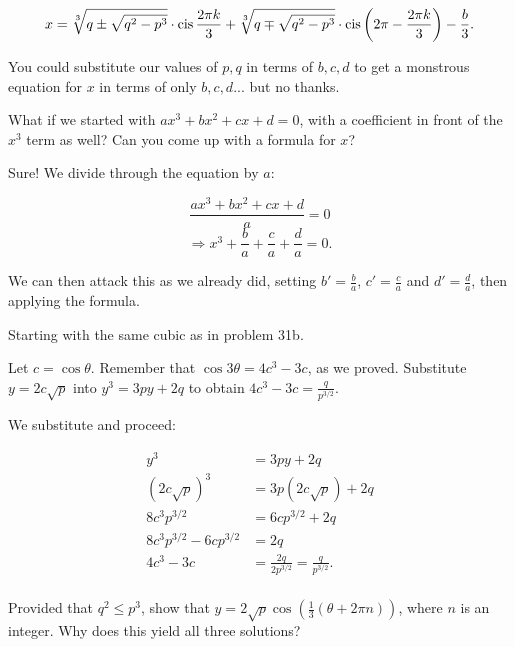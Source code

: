 \documentclass[../key.tex]{subfiles}
\begin{document}
$$x= \sqrt[3]{q \pm \sqrt{q^2 - p^3}} \cdot \operatorname{cis} \frac{2\pi k}{3} + \sqrt[3]{q \mp \sqrt{q^2 - p^3}} \cdot \operatorname{cis} \left(2\pi - \frac{2\pi k}{3}\right) - \frac{b}{3}.$$

You could substitute our values of $p,q$ in terms of $b,c,d$ to get a monstrous equation for $x$ in terms of only $b,c,d$... but no thanks.

\begin{inner_problem}
\item What if we started with $ax^3+bx^2+cx+d=0$, with a coefficient in front of the $x^3$ term as well? Can you come up with a formula for $x$?
\end{inner_problem}

Sure! We divide through the equation by $a$:

$$\frac{ax^3+bx^2+cx+d}{a}=0$$
$$\Longrightarrow x^3 + \frac{b}{a} + \frac{c}{a} + \frac{d}{a} = 0.$$

We can then attack this as we already did, setting $b'=\frac{b}{a}$, $c'=\frac{c}{a}$ and $d'=\frac{d}{a}$, then applying the formula.

\begin{outer_problem}
\item Starting with the same cubic as in problem 31b.
\end{outer_problem}

\begin{inner_problem}[start=1]
\item Let $c=\cos\theta$. Remember that $\cos 3\theta=4c^3-3c$, as we proved. Substitute $y=2c\sqrt{p}$ into $y^3=3py+2q$ to obtain $4c^3-3c=\frac{q}{p^{3/2}}$.
\end{inner_problem}

We substitute and proceed:

\begin{align*}
y^3 &= 3py+2q \\
(2c\sqrt{p})^3 &= 3p(2c\sqrt{p}) + 2q \\
8c^3 p^{3/2} &= 6c p^{3/2} + 2q \\
8c^3 p^{3/2} - 6c p^{3/2} &= 2q \\
4c^3 - 3c &= \frac{2q}{2p^{3/2}} = \frac{q}{p^{3/2}}. \\
\end{align*}

\begin{inner_problem}
\item Provided that $q^2\leq p^3$, show that $y=2\sqrt{p}\cos\left(\frac{1}{3}(\theta+2\pi n)\right)$, where $n$ is an integer. Why does this yield all three solutions?
\end{inner_problem}
\end{document}
